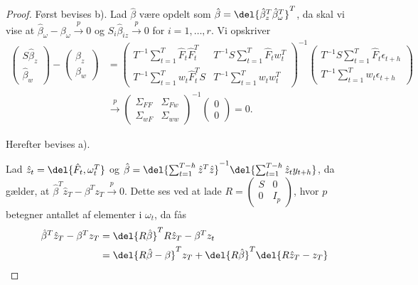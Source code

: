 \begin{proof}
Først bevises b). 
Lad \(\hat{\beta}\) være opdelt som \(\hat{\beta} = \del{\hat{\beta}_z^T \hat{\beta}_\omega^T}^T\), da skal vi vise at \(\hat{\beta}_\omega - \beta_\omega \overset{p}{\rightarrow} 0\) og \(S_i \hat{\beta}_{iz} \overset{p}{\rightarrow} 0\) for \(i = 1, \ldots, r\).
Vi opskriver
\begin{align*}
\begin{pmatrix}
S \hat{\beta}_z \\ \hat{\beta}_w
\end{pmatrix} - \begin{pmatrix}
\beta_z \\ \beta_w
\end{pmatrix} &= \begin{pmatrix}
T^{-1} \sum_{t=1}^T \hat{F}_t \hat{F}_t^T & T^{-1} S \sum_{t=1}^T \hat{F}_t w_t^T \\
T^{-1} \sum_{t=1}^T w_t \hat{F}_t^T S & T^{-1} \sum_{t=1}^T w_t w_t^T
\end{pmatrix}^{-1} \begin{pmatrix}
T^{-1} S \sum_{t=1}^T \hat{F}_t \epsilon_{t+h} \\
T^{-1} \sum_{t=1}^T w_t \epsilon_{t+h}
\end{pmatrix} \\
&\overset{p}{\rightarrow} \begin{pmatrix}
\Sigma_{FF} & \Sigma_{Fw} \\ \Sigma_{wF} & \Sigma_{ww}   
\end{pmatrix}^{-1} \begin{pmatrix}
0 \\ 0
\end{pmatrix} = 0.
\end{align*}

Herefter bevises a).

Lad \(\hat{z}_t = \del{\hat{F}_t, \omega_t^T}\) og \(\hat{\beta} = \del{\sum_{t=1}^{T-h} \hat{z}^T \hat{z}}^{-1} \del{\sum_{t=1}^{T-h} \hat{z}_t y_{t+h}}\), da gælder, at \(\hat{\beta}^T \hat{z}_T - \beta^T z_T \overset{p}{\rightarrow} 0\).
Dette ses ved at lade \(R = \begin{pmatrix}
S & 0 \\ 0 & I_p
\end{pmatrix}\), hvor \(p\) betegner antallet af elementer i \(\omega_t\), da fås
\begin{align*}
\hat{\beta}^T \hat{z}_T - \beta^T z_T &= \del{R \hat{\beta}}^T R \hat{z}_T - \beta^T z_t \\
&= \del{R \hat{\beta} - \beta}^T z_T + \del{R \hat{\beta}}^T \del{R \hat{z}_T - z_T}
\end{align*}
\end{proof}




